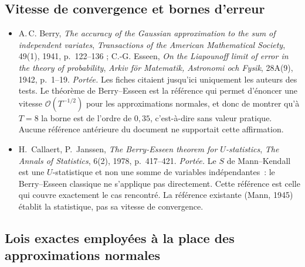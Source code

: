 \documentclass[a4paper,11pt]{article}
\begin{document}
\subsection*{Vitesse de convergence et bornes d'erreur}

\begin{itemize}[itemsep=4pt]
  \item A.\,C. Berry, \emph{The accuracy of the Gaussian approximation to the
  sum of independent variates}, \emph{Transactions of the American Mathematical
  Society}, 49(1), 1941, p.~122--136 ; C.-G. Esseen, \emph{On the Liapounoff
  limit of error in the theory of probability}, \emph{Arkiv för Matematik,
  Astronomi och Fysik}, 28A(9), 1942, p.~1--19.
  \emph{Portée.} Les fiches citaient jusqu'ici uniquement les
  auteurs des tests. Le théorème de Berry--Esseen est la référence qui permet
  d'énoncer une vitesse $\mathcal{O}(T^{-1/2})$ pour les approximations
  normales, et donc de montrer qu'à $T = 8$ la borne est de l'ordre de
  $0{,}35$, c'est-à-dire sans valeur pratique. Aucune référence antérieure du
  document ne supportait cette affirmation.

  \item H.~Callaert, P.~Janssen, \emph{The Berry-Esseen theorem for
  $U$-statistics}, \emph{The Annals of Statistics}, 6(2), 1978, p.~417--421.
  \emph{Portée.} Le $S$ de Mann--Kendall est une $U$-statistique et
  non une somme de variables indépendantes~: le Berry--Esseen classique ne
  s'applique pas directement. Cette référence est celle qui couvre exactement le
  cas rencontré. La référence existante (Mann, 1945) établit la statistique,
  pas sa vitesse de convergence.
\end{itemize}

\subsection*{Lois exactes employées à la place des approximations normales}
\end{document}
